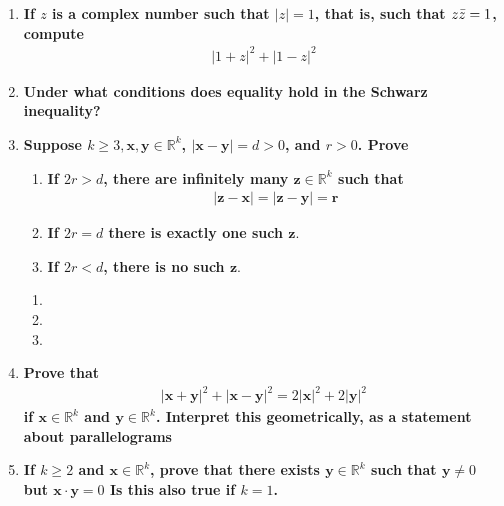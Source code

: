 \documentclass[Main.tex]{subfiles}
\begin{document}
\begin{enumerate}
        
    
    \item \textbf{If $z$ is a complex number such that $\lvert z\rvert =1$, that is, such that $z\Bar{z}=1$, compute}
    \begin{align*}
        \lvert 1 + z \rvert^2 + \lvert 1-z\rvert^2
    \end{align*}
    
        
    
    \item \textbf{Under what conditions does equality hold in the Schwarz inequality?}
    
        
    
    \item \textbf{Suppose $k\geq 3, \boldsymbol{x,y}\in\mathbb{R}^k$, $\lvert\boldsymbol{x-y}\rvert = d>0$, and $r>0$. Prove}
    \begin{enumerate}
        \item \textbf{If $2r>d$, there are infinitely many $\boldsymbol{z}\in\mathbb{R}^k$ such that}
        \begin{align*}
            \lvert\boldsymbol{z-x}\rvert = \lvert\boldsymbol{z-y}\rvert = \boldsymbol{r}
        \end{align*}
        \item \textbf{If $2r=d$ there is exactly one such $\boldsymbol{z}$}.
        \item \textbf{If $2r<d$, there is no such $\boldsymbol{z}$}.
    \end{enumerate}
    
    \begin{enumerate}
        \item 
        \item
        \item
    \end{enumerate}
    
    \item \textbf{Prove that}
    \begin{align*}
        \lvert\boldsymbol{x+y} \rvert^2 + \lvert\boldsymbol{x-y} \rvert^2=2\lvert\boldsymbol{x}\rvert^2+2\lvert\boldsymbol{y}\rvert^2
    \end{align*}
    \textbf{if $\boldsymbol{x}\in\mathbb{R}^k$ and $\boldsymbol{y}\in\mathbb{R}^k$. Interpret this geometrically, as a statement about parallelograms}
    
        
    
    \item \textbf{If $k\geq 2$ and $\boldsymbol{x}\in\mathbb{R}^k$, prove that there exists $\boldsymbol{y}\in\mathbb{R}^k$ such that $\boldsymbol{y}\not = 0$ but $\boldsymbol{x}\cdot\boldsymbol{y}=0$ Is this also true if $k=1$.}
    

\end{enumerate}
\end{document}
